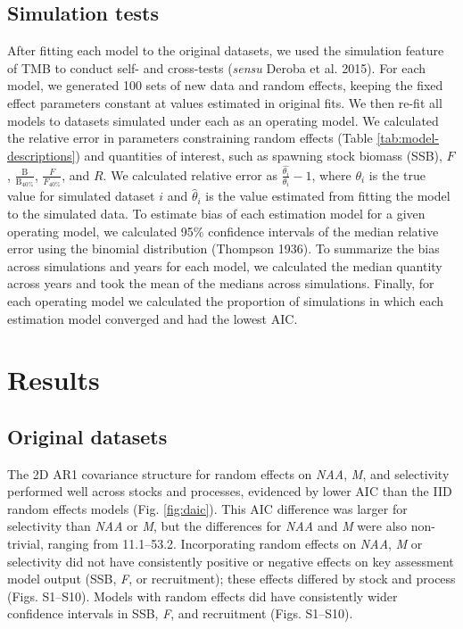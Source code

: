 \documentclass[]{article}
\begin{document}
\hypertarget{simulation-tests}{%
\subsection{Simulation tests}\label{simulation-tests}}

After fitting each model to the original datasets, we used the
simulation feature of TMB to conduct self- and cross-tests (\emph{sensu}
Deroba et al. 2015). For each model, we generated 100 sets of new data
and random effects, keeping the fixed effect parameters constant at
values estimated in original fits. We then re-fit all models to datasets
simulated under each as an operating model. We calculated the relative
error in parameters constraining random effects (Table
\ref{tab:model-descriptions}) and quantities of interest, such as
spawning stock biomass (SSB), \(F\),
\(\frac{\text{B}}{\text{B}_{40\%}}\), \(\frac{F}{F_{40\%}}\), and \(R\).
We calculated relative error as \(\frac{\hat{\theta_i}}{\theta_i}-1\),
where \(\theta_i\) is the true value for simulated dataset \(i\) and
\(\hat{\theta}_i\) is the value estimated from fitting the model to the
simulated data. To estimate bias of each estimation model for a given
operating model, we calculated 95\% confidence intervals of the median
relative error using the binomial distribution (Thompson 1936). To
summarize the bias across simulations and years for each model, we
calculated the median quantity across years and took the mean of the
medians across simulations. Finally, for each operating model we
calculated the proportion of simulations in which each estimation model
converged and had the lowest AIC.

\hypertarget{results}{%
\section{Results}\label{results}}

\hypertarget{original-datasets}{%
\subsection{Original datasets}\label{original-datasets}}

The 2D AR1 covariance structure for random effects on \emph{NAA},
\emph{M}, and selectivity performed well across stocks and processes,
evidenced by lower AIC than the IID random effects models (Fig.
\ref{fig:daic}). This AIC difference was larger for selectivity than
\emph{NAA} or \emph{M}, but the differences for \emph{NAA} and \emph{M}
were also non-trivial, ranging from 11.1--53.2. Incorporating random
effects on \emph{NAA}, \emph{M} or selectivity did not have consistently
positive or negative effects on key assessment model output (SSB,
\emph{F}, or recruitment); these effects differed by stock and process
(Figs. S1--S10). Models with random effects did have consistently wider
confidence intervals in SSB, \emph{F}, and recruitment (Figs. S1--S10).
\end{document}
